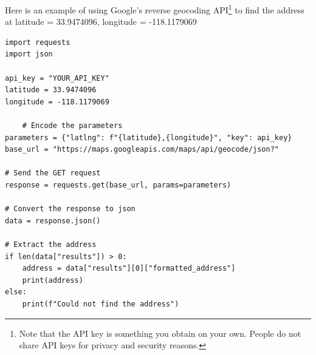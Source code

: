 Here is an example of using Google's reverse geocoding API\footnote{Note that the API key is something you obtain on your own. People do not share API keys for privacy and security reasons.} to find the
address at latitude = 33.9474096, longitude = -118.1179069


\begin{verbatim}
import requests
import json

api_key = "YOUR_API_KEY"
latitude = 33.9474096
longitude = -118.1179069

    # Encode the parameters
parameters = {"latlng": f"{latitude},{longitude}", "key": api_key}
base_url = "https://maps.googleapis.com/maps/api/geocode/json?"

# Send the GET request
response = requests.get(base_url, params=parameters)

# Convert the response to json
data = response.json()

# Extract the address
if len(data["results"]) > 0:
    address = data["results"][0]["formatted_address"]
    print(address)
else:
    print(f"Could not find the address")

\end{verbatim}
